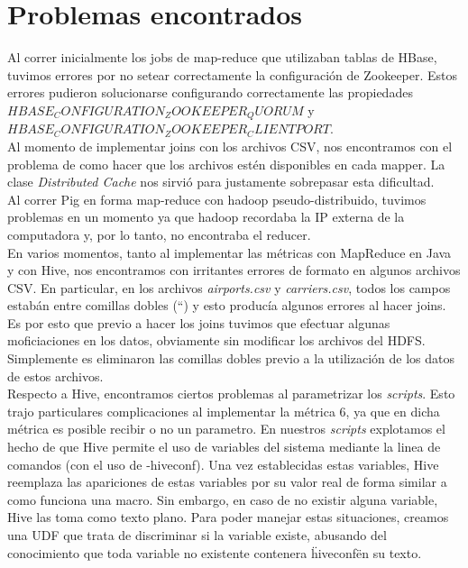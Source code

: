 \documentclass[a4paper,10pt]{article}
\begin{document}
\setcounter{page}{1}

\section{Problemas encontrados}

Al correr inicialmente los jobs de map-reduce que utilizaban tablas de HBase, tuvimos errores por no setear correctamente la configuración de Zookeeper. Estos errores
pudieron solucionarse configurando correctamente las propiedades $HBASE_CONFIGURATION_ZOOKEEPER_QUORUM$ y $HBASE_CONFIGURATION_ZOOKEEPER_CLIENTPORT$.\\

Al momento de implementar joins con los archivos CSV, nos encontramos con el problema de como hacer que los archivos estén disponibles en cada mapper. La clase
\textit{Distributed Cache} nos sirvió para justamente sobrepasar esta dificultad.\\

Al correr Pig en forma map-reduce con hadoop pseudo-distribuido, tuvimos problemas en un momento ya que hadoop recordaba la IP externa de la computadora y,
por lo tanto, no encontraba el reducer.\\

En varios momentos, tanto al implementar las métricas con MapReduce en Java y con Hive, nos encontramos con irritantes errores de formato en algunos archivos CSV. En particular,
en los archivos \textit{airports.csv} y \textit{carriers.csv}, todos los campos estabán entre comillas dobles (``) y esto producía algunos errores al hacer joins. Es por esto que
previo a hacer los joins tuvimos que efectuar algunas moficiaciones en los datos, obviamente sin modificar los archivos del HDFS. Simplemente es eliminaron las comillas dobles
previo a la utilización de los datos de estos archivos.\\

Respecto a Hive, encontramos ciertos problemas al parametrizar los \textit{scripts}. Esto trajo particulares complicaciones al implementar la métrica 6, ya que en dicha métrica es posible recibir o no un parametro. En nuestros \textit{scripts} explotamos el hecho de que Hive permite el uso de variables del sistema mediante la linea de comandos (con el uso de -hiveconf). Una vez establecidas estas variables, Hive reemplaza las apariciones de estas variables por su valor real de forma similar a como funciona una macro. Sin embargo, en caso de no existir alguna variable, Hive las toma como texto plano. Para poder manejar estas situaciones, creamos una UDF que trata de discriminar si la variable existe, abusando del conocimiento que toda variable no existente contenera \"hiveconf\" en su texto.
\end{document}
